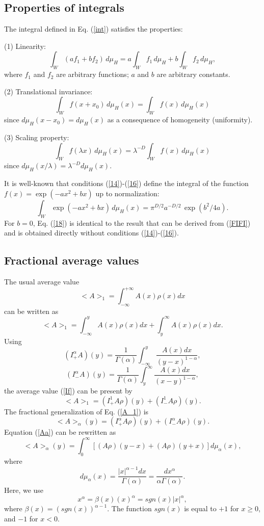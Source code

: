 \documentclass[12pt]{article}
\newcommand{\be}{\begin{equation}}
\newcommand{\ee}{\end{equation}}
\begin{document}
\subsection{Properties of integrals}

The integral defined in Eq. (\ref{int}) satisfies the properties:

(1) Linearity:
\be \label{14}
\int_W (af_1+bf_2) \, d \mu_H=
a \int_W f_1 \, d \mu_H+b \int_W f_2 \, d \mu_H ,
\ee
where $f_1$ and $f_2$ are arbitrary functions; 
$a$ and $b$ are arbitrary constants.

(2) Translational invariance:
\be \label{15}
\int_W f(x+x_0) \, d \mu_H(x)= \int_W f(x) \, d \mu_H(x)
\ee
since $d \mu_H(x - x_0)=d \mu_H(x)$ as a consequence 
of homogeneity (uniformity).

(3) Scaling property:
\be \label{16}
\int_W f(\lambda x) \, d \mu_H(x)= \lambda^{-D}\int_W f(x) \, d \mu_H(x)
\ee
since $d \mu_H (x/\lambda)=\lambda^{-D}d \mu_H(x)$.

It is well-known \cite{Wilson,Col} that
conditions (\ref{14})-(\ref{16}) define the integral of 
the function $f(x) = \exp(-ax^2+bx)$ up to normalization:
\be \label{18}
\int_W \exp(-ax^2+bx) \, d \mu_H (x)=
\pi^{D/2} a^{-D/2} \, \exp(b^2/4a) .
\ee
For $b = 0$, Eq. (\ref{18}) is identical to the result 
that can be derived from (\ref{FIFI}) and 
is obtained directly without conditions (\ref{14})-(\ref{16}).




\subsection{Fractional average values}



The usual average value
\be <A>_1= \int^{+\infty}_{-\infty} A(x)\rho(x) dx  \ee
can be written as
\be \label{If}
<A>_1=\int^y_{-\infty} A(x)\rho(x) dx +\int^{\infty}_y A(x)\rho(x) dx . \ee
Using 
\be  \label{I+} (I^{\alpha}_{+}A)(y)=
\frac{1}{\Gamma (\alpha)} \int^{y}_{-\infty}
\frac{A(x)dx}{(y-x)^{1-\alpha}} , \ee
\be \label{I-} (I^{\alpha}_{-}A)(y)=
\frac{1}{\Gamma (\alpha)} \int^{\infty}_{y}
\frac{A(x)dx}{(x-y)^{1-\alpha}} , \ee
the average value (\ref{If}) can be present by
\be \label{A_1}
<A>_1=(I^{1}_{+}A\rho)(y)+(I^{1}_{-}A\rho)(y) . 
\ee
The fractional generalization of Eq. (\ref{A_1}) is 
\be \label{Aa} <A>_{\alpha}(y)=
(I^{\alpha}_{+}A\rho)(y)+(I^{\alpha}_{-}A\rho)(y) . \ee
Equation (\ref{Aa}) can be rewritten as
\be \label{FI2} <A>_{\alpha}(y)=
\int^{\infty}_{0} [ (A\rho)(y-x)+ (A\rho)(y+x)] d\mu_{\alpha}(x) , \ee
where 
\be \label{dm}
d\mu_{\alpha}(x)=\frac{|x|^{\alpha-1} dx}{\Gamma(\alpha)}=
\frac{d x^{\alpha}}{\alpha \Gamma(\alpha)} .\ee
Here, we use 
\be \label{xa}
x^{\alpha} =\beta(x) (x)^{\alpha}= sgn(x) |x|^{\alpha} , \ee
where $\beta(x)=(sgn(x))^{\alpha-1}$. 
The function $sgn(x)$ is equal to $+1$ for $x\ge0$,
and $-1$ for $x<0$.
\end{document}
